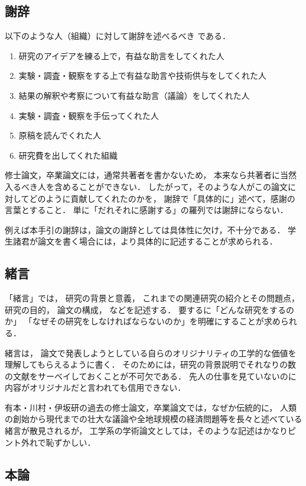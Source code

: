 \subsection{謝辞}

以下のような人（組織）に対して謝辞を述べるべき \Cite{02} である．
\begin{enumerate}
	\item 研究のアイデアを練る上で，有益な助言をしてくれた人
	\item 実験・調査・観察をする上で有益な助言や技術供与をしてくれた人
	\item 結果の解釈や考察について有益な助言（議論）をしてくれた人
	\item 実験・調査・観察を手伝ってくれた人
	\item 原稿を読んでくれた人
	\item 研究費を出してくれた組織
\end{enumerate}

修士論文，卒業論文には，通常共著者を書かないため，
本来なら共著者に当然入るべき人を含めることができない．
したがって，そのような人がこの論文に対してどのように貢献してくれたのかを，
謝辞で「具体的に」述べて，感謝の言葉とすること．
単に「だれそれに感謝する」の羅列では謝辞にならない．

例えば本手引の謝辞は，論文の謝辞としては具体性に欠け，不十分である．
学生諸君が論文を書く場合には，より具体的に記述することが求められる．


\subsection{緒言}

「緒言」では，
研究の背景と意義，
これまでの関連研究の紹介とその問題点，
研究の目的，
論文の構成，
などを記述する．
要するに「どんな研究をするのか」
「なぜその研究をしなければならないのか」を明確にすることが求められる．

緒言は，
論文で発表しようとしている自らのオリジナリティの工学的な価値を理解してもらえるように書く．
そのためには，研究の背景説明でそれなりの数の文献をサーベイしておくことが不可欠である．
先人の仕事を見ていないのに内容がオリジナルだと言われても信用できない．

有本・川村・伊坂研の過去の修士論文，卒業論文では，なぜか伝統的に，
人類の創始から現代までの壮大な議論や全地球規模の経済問題等を長々と述べている緒言が散見されるが，
工学系の学術論文としては，そのような記述はかなりピント外れで恥ずかしい．


\subsection{本論}

